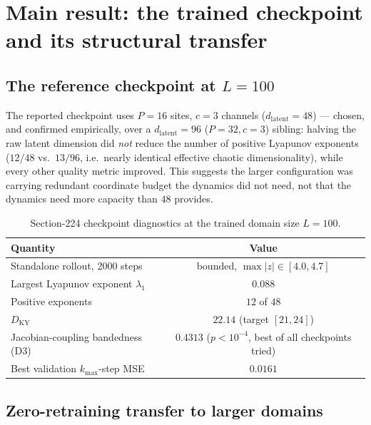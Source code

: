 \documentclass[11pt]{article}
\newcommand{\dlat}{d_{\mathrm{latent}}}
\begin{document}
\section{Main result: the trained checkpoint and its structural transfer}
\label{sec:main_result}

\subsection{The reference checkpoint at $L=100$}

The reported checkpoint uses $P=16$ sites, $c=3$ channels
($\dlat = 48$) --- chosen, and confirmed empirically, over a
$\dlat=96$ ($P=32,c=3$) sibling: halving the raw latent dimension did
\emph{not} reduce the number of positive Lyapunov exponents
($12/48$ vs.\ $13/96$, i.e.\ nearly identical effective chaotic
dimensionality), while every other quality metric improved. This
suggests the larger configuration was carrying redundant coordinate
budget the dynamics did not need, not that the dynamics need more
capacity than $48$ provides.

\begin{table}[h]
\centering
\begin{tabular}{lc}
\toprule
Quantity & Value \\
\midrule
Standalone rollout, 2000 steps & bounded, $\max|z|\in[4.0,4.7]$ \\
Largest Lyapunov exponent $\lambda_1$ & $0.088$ \\
Positive exponents & $12$ of $48$ \\
$D_{\mathrm{KY}}$ & $22.14$ (target $[21,24]$) \\
Jacobian-coupling bandedness (D3) & $0.4313$ ($p<10^{-4}$, best of all checkpoints tried) \\
Best validation $k_{\max}$-step MSE & $0.0161$ \\
\bottomrule
\end{tabular}
\caption{Section-224 checkpoint diagnostics at the trained domain size $L=100$.}
\label{tab:checkpoint}
\end{table}

\subsection{Zero-retraining transfer to larger domains}
\label{sec:transfer}
\end{document}
